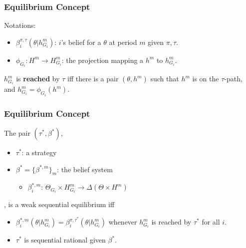 \documentclass[9pt]{beamer}
\begin{document}
\begin{frame}
  \frametitle{Equilibrium Concept}

Notations:
\begin{itemize}

\item $\beta^{\pi,\tau}_i(\theta|h^{m}_{G_i})$: $i$'s belief for a $\theta$ at period $m$ given $\pi,\tau$.
\item $\phi_{G_i}: H^m\rightarrow H^m_{G_i}$: the projection mapping a $h^m$ to $h^m_{G_i}$.
\end{itemize}

\begin{definition}
$h^m_{G_i}$ is \textbf{reached} by $\tau$ iff there is a pair $(\theta,h^m)$ such that $h^m$ is on the $\tau$-path, and $h^m_{G_i}=\phi_{G_i}(h^m)$. 
\end{definition}


\end{frame}


\begin{frame}
  \frametitle{Equilibrium Concept}


\begin{definition}
The pair $(\tau^{*},\beta^{*})$, 
\begin{itemize}
\item $\tau^{*}$: a strategy
\item $\beta^{*}=\{\beta^{*,m}\}_m$: the belief system 
\begin{itemize}
\item $\beta^{*,m}_i$: $\Theta_{G_i}\times H^{m}_{G_i} \rightarrow \Delta (\Theta\times H^m)$
\end{itemize}
\end{itemize}

, is a weak sequential equilibrium iff
\begin{itemize}
\item $\beta^{*,m}_i(\theta|h^{m}_{G_i})=\beta^{\pi,\tau^{*}}_i(\theta|h^{m}_{G_i})$ whenever $h^{m}_{G_i}$ is reached by $\tau^{*}$ for all $i$.
\item $\tau^{*}$ is sequential rational given $\beta^{*}$.
\end{itemize}





\end{definition}




\end{frame}
\end{document}
